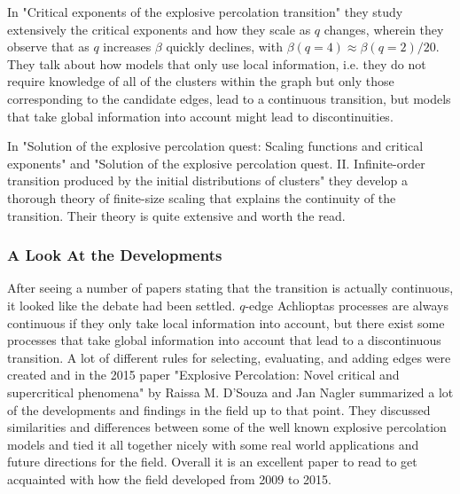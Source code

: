 In "Critical exponents of the explosive percolation transition" \cite{da_Costa_5} they study extensively the critical exponents and how they scale as $q$ changes, wherein they observe that as $q$ increases $\beta$ quickly declines, with $\beta(q = 4) \approx \beta(q = 2) / 20$.
They talk about how models that only use local information, i.e. they do not require knowledge of all of the clusters within the graph but only those corresponding to the candidate edges, lead to a continuous transition, but models that take global information into account might lead to discontinuities.

In "Solution of the explosive percolation quest: Scaling functions and critical exponents" \cite{da_Costa_2}
and "Solution of the explosive percolation quest. II. Infinite-order transition produced by the initial distributions of clusters" \cite{da_Costa_3} they develop a thorough theory of finite-size scaling that explains the continuity of the transition.
Their theory is quite extensive and worth the read.



\subsubsection{A Look At the Developments}
After seeing a number of papers stating that the transition is actually continuous, it looked like the debate had been settled.
$q$-edge Achlioptas processes are always continuous if they only take local information into account, but there exist some processes that take global information into account that lead to a discontinuous transition.
A lot of different rules for selecting, evaluating, and adding edges were created and in the 2015 paper "Explosive Percolation: Novel critical and supercritical phenomena" \cite{D_Souza_2} by Raissa M. D’Souza and Jan Nagler summarized a lot of the developments and findings in the field up to that point.
They discussed similarities and differences between some of the well known explosive percolation models and tied it all together nicely with some real world applications and future directions for the field.
Overall it is an excellent paper to read to get acquainted with how the field developed from 2009 to 2015.
